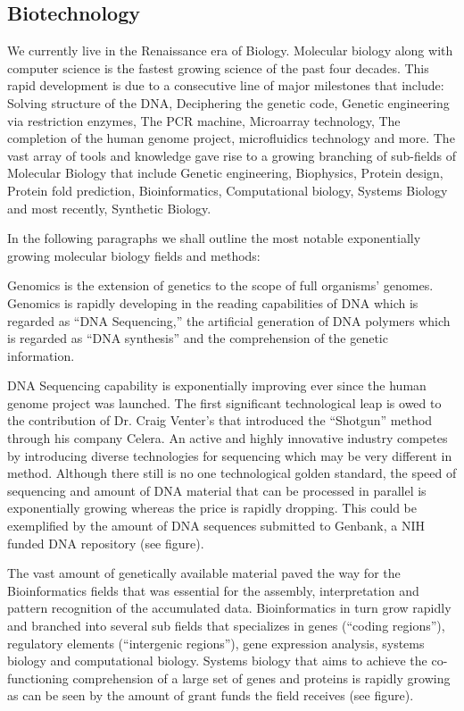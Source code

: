 \documentclass[letter,11pt]{article}
\begin{document}
\subsection{Biotechnology}
\label{et-bio}

We currently live in the Renaissance era of Biology. Molecular biology along
with computer science is the fastest growing science of the past four decades.
This rapid development is due to a consecutive line of major milestones that
include: Solving structure of the DNA, Deciphering the genetic code, Genetic
engineering via restriction enzymes, The PCR machine, Microarray technology, The
completion of the human genome project, microfluidics technology and more. The
vast array of tools and knowledge gave rise to a growing branching of
sub-fields of Molecular Biology that include Genetic engineering, Biophysics,
Protein design, Protein fold prediction, Bioinformatics, Computational biology,
Systems Biology and most recently, Synthetic Biology.
 
In the following paragraphs we shall outline the most notable exponentially
growing molecular biology fields and methods:
 
Genomics is the extension of genetics to the scope of full organisms' genomes.
Genomics is rapidly developing in the reading capabilities of DNA which is
regarded as ``DNA Sequencing,'' the artificial generation of DNA polymers which
is regarded as ``DNA synthesis'' and the comprehension of the genetic
information.
 
DNA Sequencing capability is exponentially improving ever since the human
genome project was launched. The first significant technological leap is owed
to the contribution of Dr. Craig Venter's that introduced the ``Shotgun'' method
through his company Celera. An active and highly innovative industry competes
by introducing diverse technologies for sequencing which may be very different
in method. Although there still is no one technological golden standard, the
speed of sequencing and amount of DNA material that can be processed in
parallel is exponentially growing whereas the price is rapidly dropping. This
could be exemplified by the amount of DNA sequences submitted to Genbank, a NIH
funded DNA repository (see figure).

The vast amount of genetically available material paved the way for the
Bioinformatics fields that was essential for the assembly, interpretation and
pattern recognition of the accumulated data. Bioinformatics in turn grow
rapidly and branched into several sub fields that specializes in genes (``coding
regions''), regulatory elements (``intergenic regions''), gene expression
analysis, systems biology and computational biology. Systems biology that aims
to achieve the co-functioning comprehension of a large set of genes and
proteins is rapidly growing as can be seen by the amount of grant funds the
field receives (see figure).
 
\end{document}
